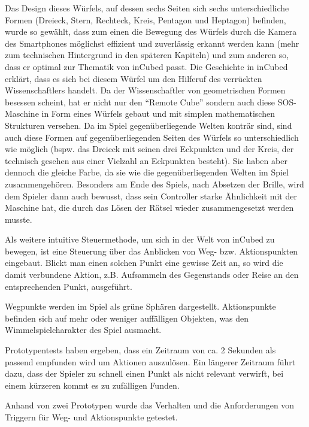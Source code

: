 Das Design dieses Würfels, auf dessen sechs Seiten sich sechs unterschiedliche Formen (Dreieck, Stern, Rechteck, Kreis, Pentagon und Heptagon) befinden, wurde so gewählt, dass zum einen die Bewegung des Würfels durch die Kamera des Smartphones möglichst effizient und zuverlässig erkannt werden kann (mehr zum technischen Hintergrund in den späteren Kapiteln) und zum anderen so, dass er optimal zur Thematik von inCubed passt. Die Geschichte in inCubed erklärt, dass es sich bei diesem Würfel um den Hilferuf des verrückten Wissenschaftlers handelt. Da der Wissenschaftler von geometrischen Formen besessen scheint, hat er nicht nur den \enquote{Remote Cube} sondern auch diese SOS-Maschine in Form eines Würfels gebaut und mit simplen mathematischen Strukturen versehen. Da im Spiel gegenüberliegende Welten konträr sind, sind auch diese Formen auf gegenüberliegenden Seiten des Würfels so unterschiedlich wie möglich (bspw. das Dreieck mit seinen drei Eckpunkten und der Kreis, der technisch gesehen aus einer Vielzahl an Eckpunkten besteht). Sie haben aber dennoch die gleiche Farbe, da sie wie die gegenüberliegenden Welten im Spiel zusammengehören. Besonders am Ende des Spiels, nach Absetzen der Brille, wird dem Spieler dann auch bewusst, dass sein Controller starke Ähnlichkeit mit der Maschine hat, die durch das Lösen der Rätsel wieder zusammengesetzt werden musste.


Als weitere intuitive Steuermethode, um sich in der Welt von inCubed zu bewegen, ist eine Steuerung über das Anblicken von Weg- bzw. Aktionspunkten eingebaut. Blickt man einen solchen Punkt eine gewisse Zeit an, so wird die damit verbundene Aktion, z.B. Aufsammeln des Gegenstands oder Reise an den entsprechenden Punkt, ausgeführt.

Wegpunkte werden im Spiel als grüne Sphären dargestellt. Aktionspunkte befinden sich auf mehr oder weniger auffälligen Objekten, was den Wimmelspielcharakter des Spiel ausmacht.

Prototypentests haben ergeben, dass ein Zeitraum von ca. 2 Sekunden als passend empfunden wird um Aktionen auszulösen. Ein längerer Zeitraum führt dazu, dass der Spieler zu schnell einen Punkt als nicht relevant verwirft, bei einem kürzeren kommt es zu zufälligen Funden.


Anhand von zwei Prototypen wurde das Verhalten und die Anforderungen von Triggern für Weg- und Aktionspunkte getestet.

